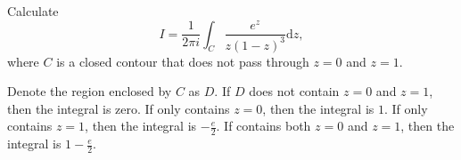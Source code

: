 
\begin{exercise}{}{}
  Calculate
  \begin{equation}
    I = \frac{1}{2\pi i} \int_C \frac{e^z}{z(1-z)^3} \mathrm{d} z,
  \end{equation}
  where $C$ is a closed contour that does not pass through $z = 0$ and $z = 1$.
\end{exercise}

\begin{solution}
  Denote the region enclosed by $C$ as $D$.
  If $D$ does not contain $z = 0$ and $z = 1$, then the integral is zero.
  If only contains $z = 0$, then the integral is $1$.
  If only contains $z = 1$, then the integral is $- \frac{e}{2}$.
  If contains both $z = 0$ and $z = 1$, then the integral is $1 - \frac{e}{2}$.
\end{solution}










